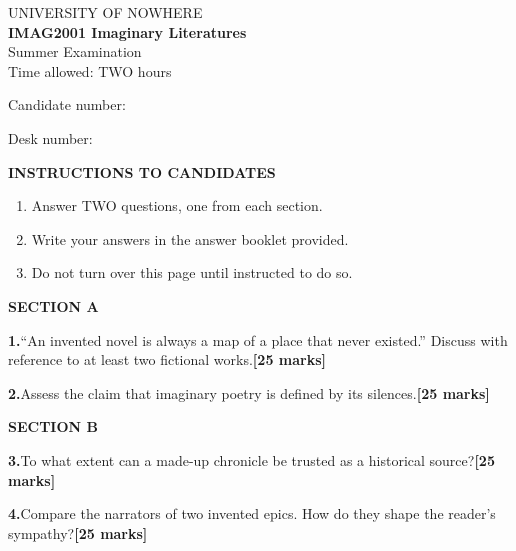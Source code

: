 \documentclass[12pt,a4paper]{article}
\newcommand{\qq}[2]{\par\bigskip\noindent\textbf{#1.}\quad #2\hfill\textbf{[25 marks]}\par}
\begin{document}
\thispagestyle{empty}
\begin{center}
{\large UNIVERSITY OF NOWHERE}\\[10pt]
{\Large\textbf{IMAG2001 Imaginary Literatures}}\\[6pt]
Summer Examination\\[4pt]
Time allowed: TWO hours
\end{center}
\vspace{10pt}
\noindent Candidate number: \makebox[0.35\textwidth]{\hrulefill}\par\vspace{6pt}
\noindent Desk number: \makebox[0.2\textwidth]{\hrulefill}\par\vspace{12pt}
\noindent\textbf{INSTRUCTIONS TO CANDIDATES}
\begin{enumerate}\setlength{\itemsep}{2pt}
\item Answer TWO questions, one from each section.
\item Write your answers in the answer booklet provided.
\item Do not turn over this page until instructed to do so.
\end{enumerate}
\clearpage
\noindent\textbf{SECTION A}
\qq{1}{``An invented novel is always a map of a place that never existed.'' Discuss with reference to at least two fictional works.}
\qq{2}{Assess the claim that imaginary poetry is defined by its silences.}
\par\bigskip\noindent\textbf{SECTION B}
\qq{3}{To what extent can a made-up chronicle be trusted as a historical source?}
\qq{4}{Compare the narrators of two invented epics. How do they shape the reader's sympathy?}
\end{document}
